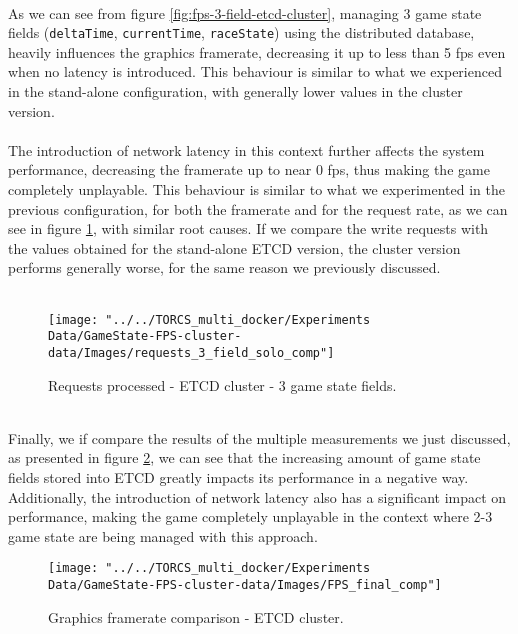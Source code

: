 \\ As we can see from figure \ref{fig:fps-3-field-etcd-cluster}, managing 3 game state fields (\texttt{deltaTime}, \texttt{currentTime}, \texttt{raceState}) using the distributed database, heavily influences the graphics framerate, decreasing it up to less than 5 fps even when no latency is introduced. This behaviour is similar to what we experienced in the stand-alone configuration, with generally lower values in the cluster version. \\ \\
The introduction of network latency in this context further affects the system performance, decreasing the framerate up to near 0 fps, thus making the game completely unplayable. This behaviour is similar to what we experimented in the previous configuration, for both the framerate and for the request rate, as we can see in figure \ref{fig:requests-3-field-etcd-cluster}, with similar root causes. If we compare the write requests with the values obtained for the stand-alone ETCD version, the cluster version performs generally worse, for the same reason we previously discussed. \\ \\
\begin{figure}[h!]
	\centering
	\texttt{[image: "../../TORCS\_multi\_docker/Experiments Data/GameState-FPS-cluster-data/Images/requests\_3\_field\_solo\_comp"]}
	\caption[Requests processed - ETCD stand-alone - 3 game state fields]{Requests processed - ETCD cluster - 3 game state fields.}
	\label{fig:requests-3-field-etcd-cluster}
\end{figure}
\pagebreak
\\ Finally, we if compare the results of the multiple measurements we just discussed, as presented in figure \ref{fig:fps-comparison-etcd-cluster}, we can see that the increasing amount of game state fields stored into ETCD greatly impacts its performance in a negative way. Additionally, the introduction of network latency also has a significant impact on performance, making the game completely unplayable in the context where 2-3 game state are being managed with this approach. \\
\begin{figure}[h!]
	\centering
	\texttt{[image: "../../TORCS\_multi\_docker/Experiments Data/GameState-FPS-cluster-data/Images/FPS\_final\_comp"]}
	\caption[Graphics framerate comparison - ETCD cluster]{Graphics framerate comparison - ETCD cluster.}
	\label{fig:fps-comparison-etcd-cluster}
\end{figure}
